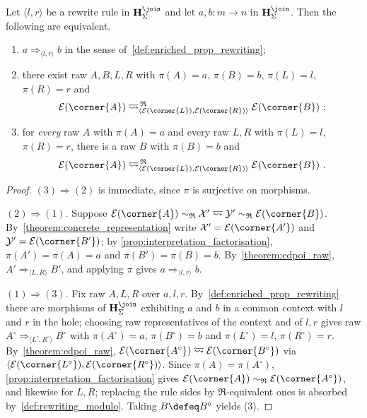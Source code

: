 \begin{theorem}\label{theorem:edpoi_rewriting_slat}
Let $\langle l, r \rangle$ be a rewrite rule in $\mathbf{H}^{\join}_{\Sigma}$ and let
$a, b : m \to n$ in $\mathbf{H}^{\join}_{\Sigma}$.
Then the following are equivalent.
\begin{enumerate}
  \item $a \Rightarrow_{\langle l, r \rangle} b$ in the sense
        of~\cref{def:enriched_prop_rewriting};
  \item there exist raw $A, B, L, R$ with $\pi(A) = a$, $\pi(B) = b$, $\pi(L) = l$,
        $\pi(R) = r$ and
        \[
        \mathcal{E}(\corner{A})
        \;\overline{\rightsquigarrow}^{\,\mathfrak{R}}_{\langle \mathcal{E}(\corner{L}), \mathcal{E}(\corner{R}) \rangle}\;
        \mathcal{E}(\corner{B})~;
        \]
  \item for \emph{every} raw $A$ with $\pi(A) = a$ and every raw $L, R$ with
        $\pi(L) = l$, $\pi(R) = r$, there is a raw $B$ with $\pi(B) = b$ and
        \[
        \mathcal{E}(\corner{A})
        \;\overline{\rightsquigarrow}^{\,\mathfrak{R}}_{\langle \mathcal{E}(\corner{L}), \mathcal{E}(\corner{R}) \rangle}\;
        \mathcal{E}(\corner{B})~.
        \]
\end{enumerate}
\end{theorem}
\begin{proof}
$(3) \Rightarrow (2)$ is immediate, since $\pi$ is surjective on morphisms.

$(2) \Rightarrow (1)$.
Suppose $\mathcal{E}(\corner{A}) \sim_{\mathfrak{R}} \mathcal{X}'
\;\overline{\rightsquigarrow}\; \mathcal{Y}' \sim_{\mathfrak{R}} \mathcal{E}(\corner{B})$.
By~\cref{theorem:concrete_representation} write $\mathcal{X}' = \mathcal{E}(\corner{A'})$
and $\mathcal{Y}' = \mathcal{E}(\corner{B'})$; by
\cref{prop:interpretation_factorisation}, $\pi(A') = \pi(A) = a$ and
$\pi(B') = \pi(B) = b$.
By~\cref{theorem:edpoi_raw}, $A' \Rightarrow_{\langle L, R \rangle} B'$, and applying
$\pi$ gives $a \Rightarrow_{\langle l, r \rangle} b$.

$(1) \Rightarrow (3)$.
Fix raw $A, L, R$ over $a, l, r$.
By~\cref{def:enriched_prop_rewriting} there are morphisms of
$\mathbf{H}^{\join}_{\Sigma}$ exhibiting $a$ and $b$ in a common context with $l$ and
$r$ in the hole; choosing raw representatives of the context and of $l, r$ gives raw
$A^{\circ} \Rightarrow_{\langle L^{\circ}, R^{\circ} \rangle} B^{\circ}$ with
$\pi(A^{\circ}) = a$, $\pi(B^{\circ}) = b$ and $\pi(L^{\circ}) = l$,
$\pi(R^{\circ}) = r$.
By~\cref{theorem:edpoi_raw},
$\mathcal{E}(\corner{A^{\circ}}) \;\overline{\rightsquigarrow}\;
\mathcal{E}(\corner{B^{\circ}})$ via
$\langle \mathcal{E}(\corner{L^{\circ}}), \mathcal{E}(\corner{R^{\circ}}) \rangle$.
Since $\pi(A) = \pi(A^{\circ})$, \cref{prop:interpretation_factorisation} gives
$\mathcal{E}(\corner{A}) \sim_{\mathfrak{R}} \mathcal{E}(\corner{A^{\circ}})$, and
likewise for $L, R$; replacing the rule sides by $\mathfrak{R}$-equivalent ones is
absorbed by~\cref{def:rewriting_modulo}.
Taking $B \defeq B^{\circ}$ yields (3).
\end{proof}


